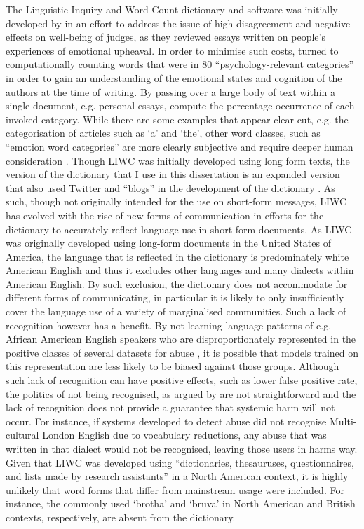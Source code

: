 The Linguistic Inquiry and Word Count dictionary and software was initially developed by \citet{Pennebaker:2001} in an effort to address the issue of high disagreement and negative effects on well-being of judges, as they reviewed essays written on people's experiences of emotional upheaval. In order to minimise such costs, \citet{Pennebaker:2001} turned to computationally counting words that were in $80$ ``psychology-relevant categories'' in order to gain an understanding of the emotional states and cognition of the authors at the time of writing. By passing over a large body of text within a single document, e.g. personal essays, \citet{Pennebaker:2001} compute the percentage occurrence of each invoked category. While there are some examples that appear clear cut, e.g. the categorisation of articles such as `a' and `the',
other word classes, such as ``emotion word categories'' are more clearly subjective and require deeper human consideration \citep{Tauscik:2010}.
Though LIWC was initially developed using long form texts, the version of the dictionary that I use in this dissertation is an expanded version that also used Twitter and ``blogs'' in the development of the dictionary \citep{Pennebaker:2015}. As such, though not originally intended for the use on short-form messages, LIWC has evolved with the rise of new forms of communication in efforts for the dictionary to accurately reflect language use in short-form documents.
As LIWC was originally developed using long-form documents in the United States of America, the language that is reflected in the dictionary is predominately white American English and thus it excludes other languages and many dialects within American English. By such exclusion, the dictionary does not accommodate for different forms of communicating, in particular it is likely to only insufficiently cover the language use of a variety of marginalised communities. Such a lack of recognition however has a benefit. By not learning language patterns of e.g. African American English speakers who are disproportionately represented in the positive classes of several datasets for abuse \citep{Waseem:2018,Davidson:2019}, it is possible that models trained on this representation are less likely to be biased against those groups. Although such lack of recognition can have positive effects, such as lower false positive rate, the politics of not being recognised, as argued by \citet{Benjamin:2019} are not straightforward and the lack of recognition does not provide a guarantee that systemic harm will not occur. For instance, if systems developed to detect abuse did not recognise Multi-cultural London English due to vocabulary reductions, any abuse that was written in that dialect would not be recognised, leaving those users in harms way. Given that LIWC was developed using ``dictionaries, thesauruses, questionnaires, and lists made by research assistants'' \citep{Tauscik:2010} in a North American context, it is highly unlikely that word forms that differ from mainstream usage were included. For instance, the commonly used `brotha' and `bruva' in North American and British contexts, respectively, are absent from the dictionary.
\vspace{5mm}

